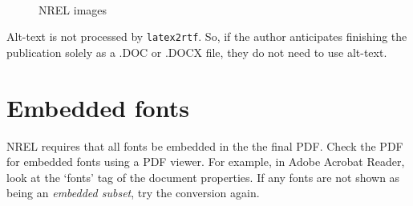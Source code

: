 \documentclass[12pt,letterpaper]{report}
\begin{document}
\begin{figure}[!h]
\centering
\hfill
{}
~ %
\hfill
{}
\hfill
\caption{NREL images}\label{fig:NRELimagesWithAltText}
\end{figure}

Alt-text is not processed by \texttt{latex2rtf}. So, if the author anticipates finishing the publication solely as a .DOC or .DOCX file, they do not need to use alt-text.

\section{Embedded fonts}
NREL requires that all fonts be embedded in the the final PDF. Check the PDF for embedded fonts using a PDF viewer. For example, in Adobe Acrobat Reader, look at the `fonts' tag of the document properties. If any fonts are not shown as being an \emph{embedded subset}, try the conversion again. 
\end{document}
